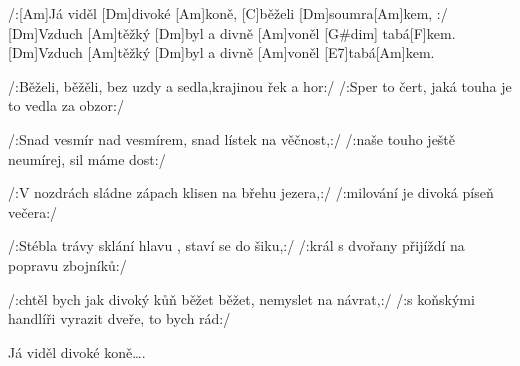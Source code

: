 
/:[Am]Já viděl [Dm]divoké [Am]koně, [C]běželi [Dm]soumra[Am]kem, :/
[Dm]Vzduch [Am]těžký [Dm]byl a divně [Am]voněl [G#dim] tabá[F]kem.
[Dm]Vzduch [Am]těžký [Dm]byl a divně [Am]voněl [E7]tabá[Am]kem.

/:Běželi, běžěli, bez uzdy a sedla,krajinou řek a hor:/
/:Sper to čert, jaká touha je to vedla za obzor:/

/:Snad vesmír nad vesmírem, snad lístek na věčnost,:/
/:naše touho ještě neumírej, sil máme dost:/

/:V nozdrách sládne zápach klisen na břehu jezera,:/
/:milování je divoká píseň večera:/

/:Stébla trávy sklání hlavu , staví se do šiku,:/
/:král s dvořany přijíždí na popravu zbojníků:/

/:chtěl bych jak divoký kůň běžet běžet, nemyslet na návrat,:/
/:s koňskými handlíři vyrazit dveře, to bych rád:/

Já viděl divoké koně….
\slpc
